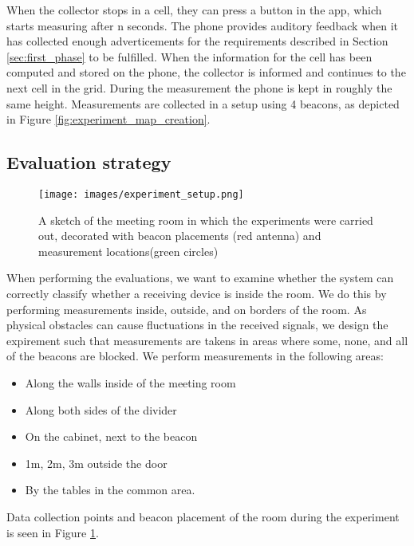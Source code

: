 When the collector stops in a cell, they can press a button in the app, which starts measuring after n seconds. 
The phone provides auditory feedback when it has collected enough adverticements for the requirements described in Section \ref{sec:first_phase} to be fulfilled.
When the information for the cell has been computed and stored on the phone, the collector is informed and continues to the next cell in the grid. 
During the measurement the phone is kept in roughly the same height.
Measurements are collected in a setup using 4 beacons, as depicted in Figure \ref{fig:experiment_map_creation}.

\subsection{Evaluation strategy}
\begin{figure}[h]
    \centering
    \texttt{[image: images/experiment\_setup.png]}
    \caption{A sketch of the meeting room in which the experiments were carried out, decorated with beacon placements (red antenna) and measurement locations(green circles)}
    \label{fig:experiment_setup}
\end{figure}
When performing the evaluations, we want to examine whether the system can correctly classify whether a receiving device is inside the room.
We do this by performing measurements inside, outside, and on borders of the room.
As physical obstacles can cause fluctuations in the received signals, we design the expirement such that measurements are takens in areas where some, none, and all of the beacons are blocked. 
We perform measurements in the following areas:
\begin{itemize}
    \item Along the walls inside of the meeting room
    \item Along both sides of the divider
    \item On the cabinet, next to the beacon
    \item 1m, 2m, 3m outside the door
    \item By the tables in the common area. 
\end{itemize}
Data collection points and beacon placement of the room during the experiment is seen in Figure \ref{fig:experiment_setup}.
